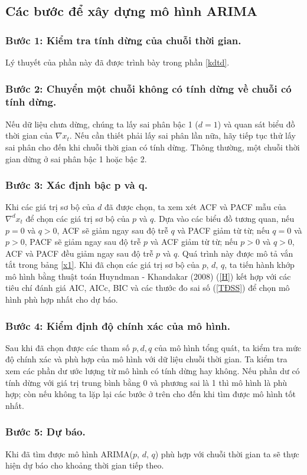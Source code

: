 \documentclass[12pt, a4paper,oneside]{book}
\theoremstyle{definition}
\begin{document}
\subsection{Các bước để xây dựng mô hình ARIMA} 
\subsubsection*{Bước 1: Kiểm tra tính dừng của chuỗi thời gian.}
Lý thuyết của phần này đã được trình bày trong phần \ref{kdtd}.
\subsubsection*{Bước 2: Chuyển một chuỗi không có tính dừng về chuỗi có tính dừng.}
Nếu dữ liệu chưa dừng, chúng ta lấy sai phân bậc 1 ($d = 1$) và quan sát biểu đồ thời gian của $\nabla x_{t}$. Nếu cần thiết phải lấy sai phân lần nữa, hãy tiếp tục thử lấy sai phân cho đến khi chuỗi thời gian có tính dừng. Thông thường, một chuỗi thời gian dừng ở sai phân bậc 1 hoặc bậc 2.
\subsubsection*{Bước 3: Xác định bậc p và q.}
Khi các giá trị sơ bộ của $d$ đã được chọn, ta xem xét ACF và PACF mẫu của $\nabla^{d}x_{t}$ để chọn các giá trị sơ bộ của $p$ và $q$. Dựa vào các biểu đồ tương quan, nếu $p = 0$ và $q> 0$, ACF sẽ giảm ngay sau độ trễ $q$ và PACF giảm từ từ; nếu $q = 0$ và $p> 0$, PACF sẽ giảm ngay sau độ trễ $p$ và ACF giảm từ từ; nếu $p> 0$ và $q> 0$, ACF và PACF đều giảm ngay sau độ trễ $p$ và $q$. Quá trình này được mô tả vắn tắt trong bảng \ref{x1}. Khi đã chọn các giá trị sơ bộ của $p$, $d$, $q$, ta tiến hành khớp mô hình bằng thuật toán Huyndman - Khandakar (2008) (\ref{H}) kết hợp với các tiêu chí đánh giá AIC, AICc, BIC và các thước đo sai số (\ref{TĐSS}) để chọn mô hình phù hợp nhất cho dự báo. 
\subsubsection*{Bước 4: Kiểm định độ chính xác của mô hình.}
Sau khi đã chọn được các tham số $ p, d , q $ của mô hình tổng quát, ta kiểm tra mức độ chính xác và phù hợp của mô hình với dữ liệu chuỗi thời gian. Ta kiểm tra xem các phần dư ước lượng từ mô hình có tính dừng hay không. Nếu phần dư có tính dừng với giá trị trung bình bằng 0 và phương sai là 1 thì mô hình là phù hợp; còn nếu không ta lặp lại các bước ở trên cho đến khi tìm được mô hình tốt nhất.
\subsubsection*{Bước 5: Dự báo.}
Khi đã tìm được mô hình ARIMA($p$, $d$, $q$) phù hợp với chuỗi thời gian ta sẽ thực hiện dự báo cho khoảng thời gian tiếp theo.
\end{document}
